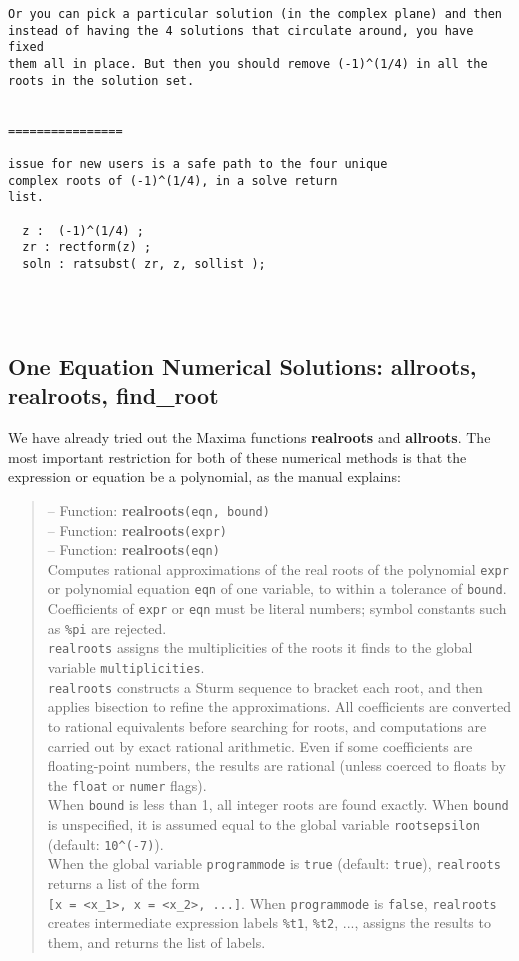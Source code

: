 \documentclass[12pt]{article}
\begin{document}
\begin{verbatim}
Or you can pick a particular solution (in the complex plane) and then 
instead of having the 4 solutions that circulate around, you have fixed 
them all in place. But then you should remove (-1)^(1/4) in all the 
roots in the solution set.


================

issue for new users is a safe path to the four unique
complex roots of (-1)^(1/4), in a solve return
list.

  z :  (-1)^(1/4) ;
  zr : rectform(z) ;
  soln : ratsubst( zr, z, sollist );
  
  


\end{verbatim}
  
\subsection{One Equation Numerical Solutions: allroots, realroots, find\_root}
We have already tried out the Maxima functions \textbf{realroots} and \textbf{allroots}.
The most important restriction for both of these numerical methods is that the expression
  or equation be a polynomial, as the manual explains:
\small
\begin{quote}
 -- Function: \textbf{realroots}\verb|(eqn, bound)|\\
 -- Function: \textbf{realroots}\verb|(expr)|\\
 -- Function: \textbf{realroots}\verb|(eqn)|\\ 
 Computes rational approximations of the real roots of the polynomial \verb|expr|
    or polynomial equation \verb|eqn| of one variable, to within a tolerance of \verb|bound|.
Coefficients of \verb|expr| or \verb|eqn| must be literal numbers;
   symbol constants such as \verb|%pi| are rejected.\\
\verb|realroots| assigns the multiplicities of the roots it finds to
     the global variable \verb|multiplicities|.\\
\verb|realroots| constructs a Sturm sequence to bracket each root, and
     then applies bisection to refine the approximations.
All coefficients are converted to rational equivalents before
     searching for roots, and computations are carried out by exact
     rational arithmetic.
Even if some coefficients are floating-point numbers, the results are
   rational (unless coerced to floats by the \verb|float| or \verb|numer| flags).\\
When \verb|bound| is less than 1, all integer roots are found exactly.
When \verb|bound| is unspecified, it is assumed equal to the global
     variable \verb|rootsepsilon| (default: \verb|10^(-7)|).\\
When the global variable \verb|programmode| is \verb|true| (default: \verb|true|),
 \verb|realroots| returns a list of the form\\ \verb|[x = <x_1>, x = <x_2>, ...]|.
When \verb|programmode| is \verb|false|, \verb|realroots| creates intermediate
     expression labels \verb|%t1|, \verb|%t2|, ..., assigns the results to them,
     and returns the list of labels.
\end{quote}
\end{document}
